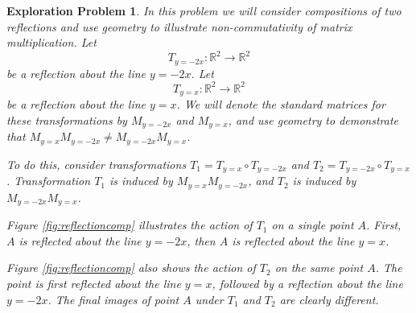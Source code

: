 \documentclass{ximera}
\newcommand{\RR}{\mathbb{R}}
\newtheorem{initprob}{Exploration Problem}
\begin{document}
\begin{initprob}\label{init:reflectioncomp}  In this problem we will consider compositions of two reflections and use geometry to illustrate non-commutativity of matrix multiplication.  
Let $$T_{y=-2x}:\RR^2\rightarrow \RR^2$$ be a reflection about the line $y=-2x$.  Let $$T_{y=x}:\RR^2\rightarrow \RR^2$$ be a reflection about the line $y=x$. We will denote the standard matrices for these transformations by $M_{y=-2x}$ and $M_{y=x}$, and
 use geometry to demonstrate that $M_{y=x}M_{y=-2x}\neq M_{y=-2x}M_{y=x}$.  
 
 To do this, consider transformations $T_1=T_{y=x}\circ T_{y=-2x}$ and $T_2=T_{y=-2x}\circ T_{y=x}$.  Transformation $T_1$ is induced by $M_{y=x}M_{y=-2x}$, and $T_2$ is induced by $M_{y=-2x}M_{y=x}$.

Figure \ref{fig:reflectioncomp} illustrates the action of $T_1$ on a single point $A$.  First, $A$ is reflected about the line $y=-2x$, then $A$ is reflected about the line $y=x$.   

Figure \ref{fig:reflectioncomp} also shows the action of $T_2$ on the same point $A$.  The point is first reflected about the line $y=x$, followed by a reflection about the line $y=-2x$.  The final images of point $A$ under $T_1$ and $T_2$ are clearly different.

\begin{center}   
  \quad\quad
\begin{tikzpicture}[scale=.3]
 

\end{tikzpicture}
\end{center}
\end{initprob}
\end{document}
